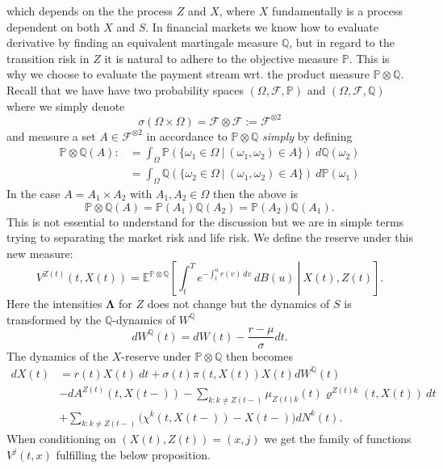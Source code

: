\documentclass[
]{book}
\begin{document}
which depends on the the process \(Z\) and \(X\), where \(X\) fundamentally is a process dependent on both \(X\) and \(S\). In financial markets we know how to evaluate derivative by finding an equivalent martingale measure \(\mathbb Q\), but in regard to the transition risk in \(Z\) it is natural to adhere to the objective measure \(\mathbb P\). This is why we choose to evaluate the payment stream wrt. the product measure \(\mathbb P\otimes \mathbb Q\). Recall that we have have two probability spaces \((\Omega, \mathcal F,\mathbb P)\) and \((\Omega, \mathcal F,\mathbb Q)\) where we simply denote
\[
\sigma(\Omega\times\Omega)=\mathcal F \otimes \mathcal F:=\mathcal F^{\otimes2}
\]
and measure a set \(A\in \mathcal F^{\otimes2}\) in accordance to \(\mathbb P\otimes \mathbb Q\) \emph{simply} by defining
\begin{align*}
\mathbb P\otimes \mathbb Q(A):&=\int_\Omega \mathbb P(\{\omega_1 \in \Omega\ \vert\ (\omega_1,\omega_2) \in A\})\ d\mathbb Q(\omega_2)\\
&=\int_\Omega \mathbb Q(\{\omega_2 \in \Omega\ \vert\ (\omega_1,\omega_2) \in A\})\ d\mathbb P(\omega_1)
\end{align*}
In the case \(A=A_1\times A_2\) with \(A_1,A_2\in \Omega\) then the above is
\[
\mathbb P\otimes \mathbb Q(A)=\mathbb P(A_1)\mathbb Q(A_2)=\mathbb P(A_2)\mathbb Q(A_1).
\]
This is not essential to understand for the discussion but we are in simple terms trying to separating the market risk and life risk. We define the reserve under this new measure:
\[
V^{Z(t)}(t,X(t))=\mathbb E^{\mathbb P\otimes\mathbb Q}\left[\left. \int_t^Te^{-\int_t^u r(v)\ dv}\ dB(u)\ \right\vert\ X(t),Z(t)\right].
\]
Here the intensities \(\mathbf \Lambda\) for \(Z\) does not change but the dynamics of \(S\) is transformed by the \(\mathbb Q\)-dynamics of \(W^\mathbb Q\)
\[
dW^\mathbb Q(t)=dW(t)-\frac{r-\mu}{\sigma}dt.
\]
The dynamics of the \(X\)-reserve under \(\mathbb P\otimes \mathbb Q\) then becomes
\begin{align*}
dX(t)&=r(t)X(t)\ dt+\sigma(t)\pi(t,X(t))X(t)dW^\mathbb Q(t)\\
&-dA^{Z(t)}(t,X(t-))-\sum_{k:k\ne Z(t-)}\mu_{Z(t)k}(t) \varrho^{Z(t)k}(t,X(t))\ dt\\
&+\sum_{k:k\ne Z(t-)}\Big(\chi^k(t,X(t-))-X(t-)\Big)dN^k(t).
\end{align*}
When conditioning on \((X(t),Z(t))=(x,j)\) we get the family of functions \(V^j(t,x)\) fulfilling the below proposition.
\end{document}
